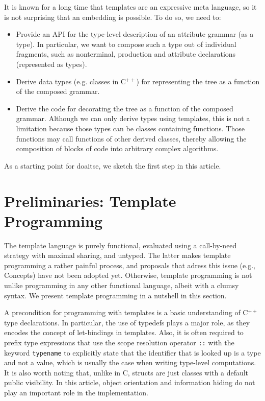 \documentclass{llncs}
\newcommand*{\Cpp}{C\ensuremath{^{++}}}
\begin{document}
  It is known for a long time that templates are
  an expressive meta language, so it is not surprising that an
  embedding is possible. To do so, we need to:
  \begin{itemize}
  \item Provide an API for the type-level description of an
    attribute grammar (as a type). In particular, we want to
    compose such a type out of individual fragments, such as
    nonterminal, production and attribute declarations (represented
    as types).
  \item Derive data types (e.g. classes in \Cpp) for representing
    the tree as a function of the composed grammar.
  \item Derive the code for decorating the tree as a function of
    the composed grammar. Although we can only derive types using
    templates, this is not a limitation because those types can
    be classes containing functions. Those functions may call
    functions of other derived classes, thereby allowing the
    composition of blocks of code into arbitrary complex
    algorithms.
  \end{itemize}
  As a starting point for doaitse, we sketch the first step in this article.

\section{Preliminaries: Template Programming}
\label{sect:templates}

  The template language is purely functional, evaluated using a
  call-by-need strategy with maximal sharing, and untyped.
  The latter makes template programming a rather painful process,
  and proposals that adress this issue (e.g., Concepts) have not been adopted yet.
  Otherwise, template programming is not unlike programming in any other
  functional language, albeit with a clumsy syntax.
  We present template programming in a nutshell in this section.

  A precondition for programming with templates is a basic understanding of \Cpp{} type
  declarations. In particular, the use of typedefs plays a
  major role, as they encodes the concept of let-bindings in templates.
  Also, it is often required to prefix type expressions that use
  the scope resolution operator \lstinline$::$ with the keyword
  \lstinline$typename$ to explicitly state that the identifier that
  is looked up is a type and not a value, which is usually the case
  when writing type-level computations.
  It is also worth noting that, unlike in C, structs are just
  classes with a default public visibility. In this article, object
  orientation and information hiding do not play an important role
  in the implementation.
\end{document}
